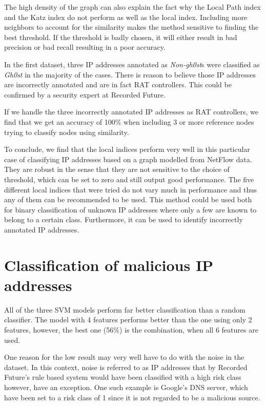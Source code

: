 The high density of the graph can also explain the fact why the Local Path index and the Katz index do not perform as well as the local index. Including more neighbors to account for the similarity makes the method sensitive to finding the best threshold. If the threshold is badly chosen, it will either result in bad precision or bad recall resulting in a poor accuracy.

In the first dataset, three IP addresses annotated as \textit{Non-gh0st}s were classified as \textit{Gh0st} in the majority of the cases. There is reason to believe those IP addresses are incorrectly annotated and are in fact RAT controllers. This could be confirmed by a security expert at Recorded Future.

If we handle the three incorrectly annotated IP addresses as RAT controllers, we find that we get an accuracy of 100\% when including 3 or more reference nodes trying to classify nodes using similarity. 

To conclude, we find that the local indices perform very well in this particular case of classifying IP addresses based on a graph modelled from NetFlow data. They are robust in the sense that they are not sensitive to the choice of threshold, which can be set to zero and still output good performance. The five different local indices that were tried do not vary much in performance and thus any of them can be recommended to be used. This method could be used both for binary classification of unknown IP addresses where only a few are known to belong to a certain class. Furthermore, it can be used to identify incorrectly annotated IP addresses. 

\section{Classification of malicious IP addresses}
All of the three SVM models perform far better classification than a random classifier. The model with 4 features performs better than the one using only 2 features, however, the best one (56\%) is the combination, when all 6 features are used. 

One reason for the low result may very well have to do with the noise in the dataset. In this context, noise is referred to as IP addresses that by Recorded Future's rule based system would have been classified with a high risk class however, have an exception. One such example is Google's DNS server, which have been set to a risk class of 1 since it is not regarded to be a malicious source. 

